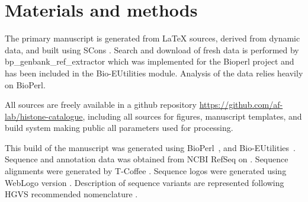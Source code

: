 \section{Materials and methods}
\label{sec:matmethods}

  The primary manuscript is generated from \LaTeX{} sources, derived
  from dynamic data, and built using SCons \citep{SCons2005}.
  Search and download of fresh data is performed by bp\_genbank\_ref\_extractor
  which was implemented for the Bioperl project \citep{bioperl} and has
  been included in the Bio-EUtilities module. Analysis of the data relies
  heavily on BioPerl.

  All sources are freely available in a github repository
  \url{https://github.com/af-lab/histone-catalogue}, including all
  sources for figures, manuscript templates, and build system making public
  all parameters used for processing.

  This build of the manuscript was generated using BioPerl~\BioPerlVersion{},
  and Bio-EUtilities~\BioEUtilitiesVersion{}.
  Sequence and annotation data was obtained from NCBI RefSeq \citep{OLearyRefseq2016}
  on \printdate{\SequencesDate{}}.
  Sequence alignments were generated by T-Coffee \TCoffeVersion{} \citep{tcoffee2000}.
  Sequence logos were generated using WebLogo version \WebLogoVersion{} \citep{weblogo}.
  Description of sequence variants are represented following HGVS
  recommended nomenclature \citep{mutnomenclature2016}.
